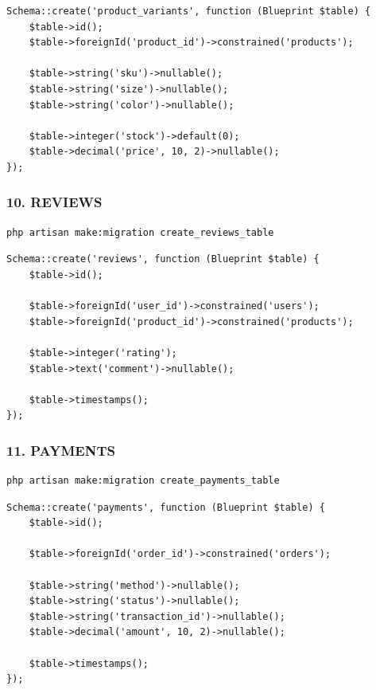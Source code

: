 \documentclass[12pt,a4paper]{article}
\begin{document}
\begin{verbatim}
Schema::create('product_variants', function (Blueprint $table) {
    $table->id();
    $table->foreignId('product_id')->constrained('products');

    $table->string('sku')->nullable();
    $table->string('size')->nullable();
    $table->string('color')->nullable();

    $table->integer('stock')->default(0);
    $table->decimal('price', 10, 2)->nullable();
});
\end{verbatim}

\subsubsection{10. REVIEWS}
\begin{verbatim}
php artisan make:migration create_reviews_table
\end{verbatim}

\begin{verbatim}
Schema::create('reviews', function (Blueprint $table) {
    $table->id();

    $table->foreignId('user_id')->constrained('users');
    $table->foreignId('product_id')->constrained('products');

    $table->integer('rating');
    $table->text('comment')->nullable();

    $table->timestamps();
});
\end{verbatim}

\subsubsection{11. PAYMENTS}
\begin{verbatim}
php artisan make:migration create_payments_table
\end{verbatim}

\begin{verbatim}
Schema::create('payments', function (Blueprint $table) {
    $table->id();

    $table->foreignId('order_id')->constrained('orders');

    $table->string('method')->nullable();
    $table->string('status')->nullable();
    $table->string('transaction_id')->nullable();
    $table->decimal('amount', 10, 2)->nullable();

    $table->timestamps();
});
\end{verbatim}
\end{document}
